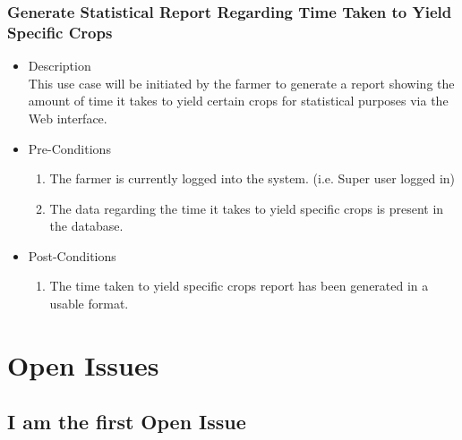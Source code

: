 \documentclass[11pt,fleqn]{book} %
\begin{document}
	\subsection{Generate Statistical Report Regarding Time Taken to Yield Specific Crops}
	\begin{itemize}
		\item Description\\
		This use case will be initiated by the farmer to generate a report showing the amount of time it takes to yield certain crops for statistical purposes via the Web interface.
		\item Pre-Conditions
		\begin{enumerate}
			\item The farmer is currently logged into the system. (i.e. Super user logged in)
			\item The data regarding the time it takes to yield specific crops is present in the database.
		\end{enumerate}
		\item Post-Conditions
		\begin{enumerate}
			\item The time taken to yield specific crops report has been generated in a usable format.
		\end{enumerate}
	\end{itemize}
	
	
	
	\chapter{Open Issues}
	
	\section{I am the first Open Issue}
	
\end{document}
